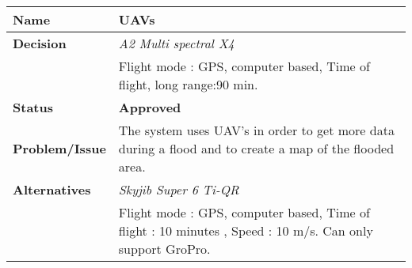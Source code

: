 \begin{table}[H]
	\begin{tabular}{L{0.2\textwidth} L{0.6\textwidth}}
						
		\textbf{Name}          & \textbf{UAVs}                                                                                                                                                              \\ \toprule
		\textbf{Decision}      & \textbf{}                                                                                                                                                             
								\textit{A2 Multi spectral X4} \\ 
								& Flight mode : GPS, computer based, Time of flight, long range:90 min. \\                                                                                        
		\textbf{Status}        & \textbf{Approved}                                                                                                                                                          \\ \midrule
		\textbf{Problem/Issue} & The system uses UAV's in order to get more data during a flood and to create a map of the flooded area.                                                                    \\ \midrule
		\textbf{Alternatives} 
		                       & \textit {Skyjib Super 6 Ti-QR}                                                                                                                                             \\
		                       & Flight mode : GPS, computer based, Time of flight : 10 minutes , Speed : 10 m/s. Can only support GroPro.                                                                
		                       

\end{tabular}
\end{table}
